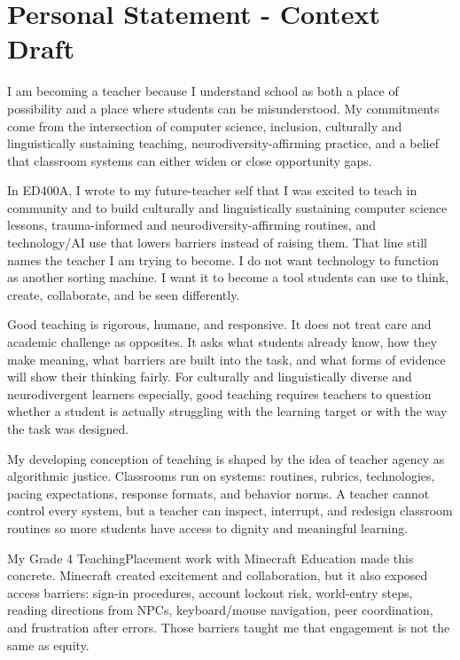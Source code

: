 \documentclass[12pt]{article}
\begin{document}
\newpage
\section{Personal Statement - Context Draft}

I am becoming a teacher because I understand school as both a place of possibility and a place where students can be misunderstood. My commitments come from the intersection of computer science, inclusion, culturally and linguistically sustaining teaching, neurodiversity-affirming practice, and a belief that classroom systems can either widen or close opportunity gaps.

In ED400A, I wrote to my future-teacher self that I was excited to teach in community and to build culturally and linguistically sustaining computer science lessons, trauma-informed and neurodiversity-affirming routines, and technology/AI use that lowers barriers instead of raising them. That line still names the teacher I am trying to become. I do not want technology to function as another sorting machine. I want it to become a tool students can use to think, create, collaborate, and be seen differently.

Good teaching is rigorous, humane, and responsive. It does not treat care and academic challenge as opposites. It asks what students already know, how they make meaning, what barriers are built into the task, and what forms of evidence will show their thinking fairly. For culturally and linguistically diverse and neurodivergent learners especially, good teaching requires teachers to question whether a student is actually struggling with the learning target or with the way the task was designed.

My developing conception of teaching is shaped by the idea of teacher agency as algorithmic justice. Classrooms run on systems: routines, rubrics, technologies, pacing expectations, response formats, and behavior norms. A teacher cannot control every system, but a teacher can inspect, interrupt, and redesign classroom routines so more students have access to dignity and meaningful learning.

My Grade 4 TeachingPlacement work with Minecraft Education made this concrete. Minecraft created excitement and collaboration, but it also exposed access barriers: sign-in procedures, account lockout risk, world-entry steps, reading directions from NPCs, keyboard/mouse navigation, peer coordination, and frustration after errors. Those barriers taught me that engagement is not the same as equity.
\end{document}
